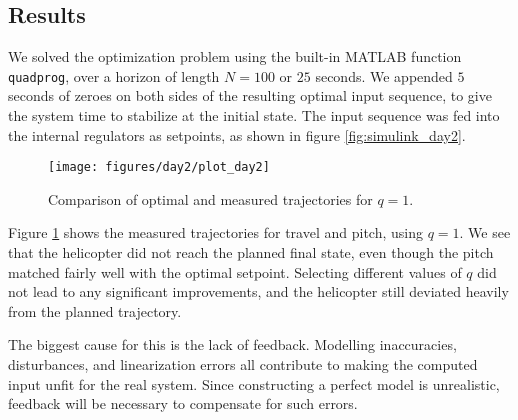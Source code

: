 \subsection{Results}

We solved the optimization problem using the built-in MATLAB function \texttt{quadprog}, over a horizon of length $N=100$ or $25$ seconds. We appended $5$ seconds of zeroes on both sides of the resulting optimal input sequence, to give the system time to stabilize at the initial state. The input sequence was fed into the internal regulators as setpoints, as shown in figure \ref{fig:simulink_day2}.

\begin{figure}[htb]
    \centering
    \texttt{[image: figures/day2/plot\_day2]}
    \caption{Comparison of optimal and measured trajectories for $q = 1$.}
    \label{fig:day2_plot}
\end{figure}

Figure \ref{fig:day2_plot} shows the measured trajectories for travel and pitch, using $q = 1$. We see that the helicopter did not reach the planned final state, even though the pitch matched fairly well with the optimal setpoint. Selecting different values of $q$ did not lead to any significant improvements, and the helicopter still deviated heavily from the planned trajectory.

The biggest cause for this is the lack of feedback. Modelling inaccuracies, disturbances, and linearization errors all contribute to making the computed input unfit for the real system. Since constructing a perfect model is unrealistic, feedback will be necessary to compensate for such errors.
